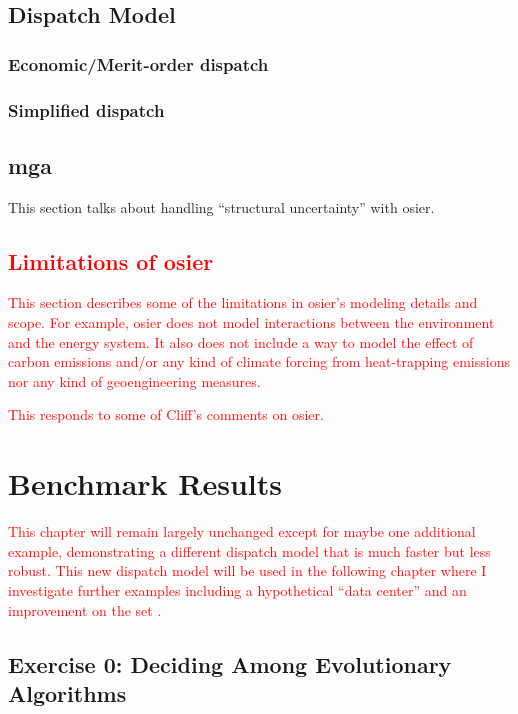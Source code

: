 \section{Dispatch Model}

\subsection{Economic/Merit-order dispatch}

\subsection{Simplified dispatch}

\section{\acf{mga}}
This section talks about handling ``structural uncertainty'' with \ac{osier}.

\textcolor{red}{
\section{Limitations of \ac{osier}}

This section describes some of the limitations in \ac{osier}'s modeling details
and scope. For example, \ac{osier} does not model interactions between the
environment and the energy system. It also does not include a way to model the
effect of carbon emissions and/or any kind of climate forcing from heat-trapping
emissions nor any kind of geoengineering measures.

This responds to some of Cliff's comments on \ac{osier}.
}


\chapter{Benchmark Results}
\label{chapter:benchmark-results}

\textcolor{red}{This chapter will remain largely unchanged except for maybe one
additional example, demonstrating a different dispatch model that is much faster
but less robust. This new dispatch model will be used in the following chapter
where I investigate further examples including a hypothetical ``data center''
and an improvement on the \acf{set} \cite{wigeland_nuclear_2014}.}

\section{Exercise 0: Deciding Among Evolutionary Algorithms}

